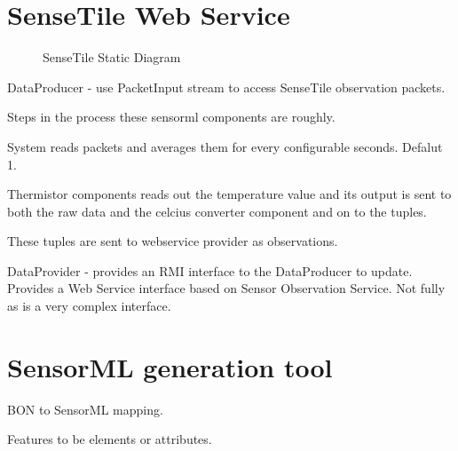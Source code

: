 \documentclass[]{final_report}
\begin{document}
\section{SenseTile Web Service}
 \begin{figure}
\caption{SenseTile Static Diagram}\label{fig:sensetile_static_diagam.png}
\end{figure}
DataProducer - use PacketInput stream to access SenseTile observation packets.

Steps in the process these sensorml components are roughly.

System reads packets and averages them for every configurable seconds. Defalut 1.

Thermistor components reads out the temperature value
and its output is sent to both the raw data and the celcius
converter component and on to the tuples.

These tuples are sent to webservice provider as observations.

DataProvider - provides an RMI interface to the DataProducer to update. Provides a Web Service interface  based on Sensor Observation Service. Not fully as is a very complex interface.

\newpage
\section{SensorML generation tool}

BON to SensorML mapping.

Features to be elements or attributes.
\end{document}

